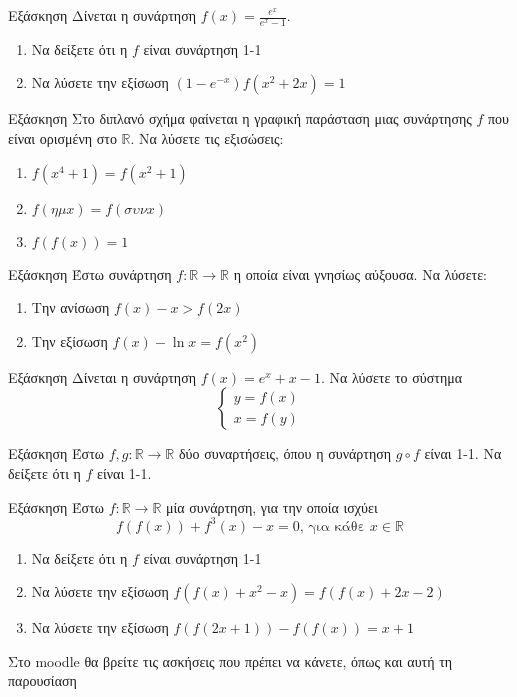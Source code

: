 \documentclass{presentation}
\begin{document}
\begin{frame}{Εξάσκηση}
  Δίνεται η συνάρτηση $f(x)=\frac{e^x}{e^x-1}$.
  \begin{enumerate}
    \item Να δείξετε ότι η $f$ είναι συνάρτηση 1-1 \pause
    \item Να λύσετε την εξίσωση $(1-e^{-x})f(x^2+2x)=1$
  \end{enumerate}
\end{frame}

\begin{frame}{Εξάσκηση}
  Στο διπλανό σχήμα φαίνεται η γραφική παράσταση μιας συνάρτησης $f$ που είναι ορισμένη στο $\mathbb{R}$. Να λύσετε τις εξισώσεις:
  \begin{enumerate}
    \item $f(x^4+1)=f(x^2+1)$ \pause
    \item $f(ημ x)=f(συν x)$ \pause
    \item $f\left( f(x) \right)=1$
  \end{enumerate}
\end{frame}

\begin{frame}{Εξάσκηση}
  Έστω συνάρτηση $f:\mathbb{R}\to \mathbb{R}$ η οποία είναι γνησίως αύξουσα. Να λύσετε:
  \begin{enumerate}
    \item Την ανίσωση $f(x)-x>f(2x)$ \pause
    \item Την εξίσωση $f(x)-\ln x=f(x^2)$
  \end{enumerate}
\end{frame}

\begin{frame}{Εξάσκηση}
  Δίνεται η συνάρτηση $f(x)=e^x+x-1$. Να λύσετε το σύστημα
  $$\begin{cases}
      y=f(x) \\
      x=f(y)
    \end{cases}$$
\end{frame}

\begin{frame}{Εξάσκηση}
  Έστω $f,g:\mathbb{R}\to\mathbb{R}$ δύο συναρτήσεις, όπου η συνάρτηση $g\circ f$ είναι 1-1. Να δείξετε ότι η $f$ είναι 1-1.
\end{frame}

\begin{frame}{Εξάσκηση}
  Έστω $f:\mathbb{R}\to\mathbb{R}$ μία συνάρτηση, για την οποία ισχύει
  $$f\left(f(x)\right)+f^3(x)-x=0\text{, για κάθε }x\in\mathbb{R}$$
  \begin{enumerate}
    \item Να δείξετε ότι η $f$ είναι συνάρτηση 1-1 \pause
    \item Να λύσετε την εξίσωση $f\left(f(x)+x^2-x\right)=f\left(f(x)+2x-2\right)$ \pause
    \item Να λύσετε την εξίσωση $f\left(f(2x+1)\right)-f\left(f(x)\right)=x+1$
  \end{enumerate}
\end{frame}

\begin{frame}
  Στο moodle θα βρείτε τις ασκήσεις που πρέπει να κάνετε, όπως και αυτή τη παρουσίαση
\end{frame}
\end{document}
